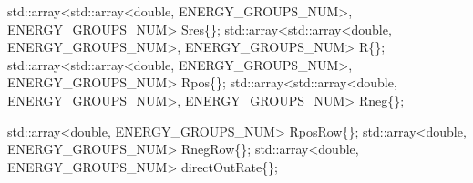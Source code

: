 \documentclass[
]{article}
\newenvironment{Shaded}{}{}
\newcommand{\BuiltInTok}[1]{\textcolor[rgb]{0.00,0.50,0.00}{#1}}
\newcommand{\DataTypeTok}[1]{\textcolor[rgb]{0.56,0.13,0.00}{#1}}
\newcommand{\NormalTok}[1]{#1}
\newcommand{\OperatorTok}[1]{\textcolor[rgb]{0.40,0.40,0.40}{#1}}
\begin{document}
\begin{Shaded}
\begin{Highlighting}[]
    \BuiltInTok{std::}\NormalTok{array}\OperatorTok{\textless{}}\BuiltInTok{std::}\NormalTok{array}\OperatorTok{\textless{}}\DataTypeTok{double}\OperatorTok{,}\NormalTok{ ENERGY\_GROUPS\_NUM}\OperatorTok{\textgreater{},}\NormalTok{ ENERGY\_GROUPS\_NUM}\OperatorTok{\textgreater{}}\NormalTok{ Sres}\OperatorTok{\{\};}
    \BuiltInTok{std::}\NormalTok{array}\OperatorTok{\textless{}}\BuiltInTok{std::}\NormalTok{array}\OperatorTok{\textless{}}\DataTypeTok{double}\OperatorTok{,}\NormalTok{ ENERGY\_GROUPS\_NUM}\OperatorTok{\textgreater{},}\NormalTok{ ENERGY\_GROUPS\_NUM}\OperatorTok{\textgreater{}}\NormalTok{ R}\OperatorTok{\{\};}
    \BuiltInTok{std::}\NormalTok{array}\OperatorTok{\textless{}}\BuiltInTok{std::}\NormalTok{array}\OperatorTok{\textless{}}\DataTypeTok{double}\OperatorTok{,}\NormalTok{ ENERGY\_GROUPS\_NUM}\OperatorTok{\textgreater{},}\NormalTok{ ENERGY\_GROUPS\_NUM}\OperatorTok{\textgreater{}}\NormalTok{ Rpos}\OperatorTok{\{\};}
    \BuiltInTok{std::}\NormalTok{array}\OperatorTok{\textless{}}\BuiltInTok{std::}\NormalTok{array}\OperatorTok{\textless{}}\DataTypeTok{double}\OperatorTok{,}\NormalTok{ ENERGY\_GROUPS\_NUM}\OperatorTok{\textgreater{},}\NormalTok{ ENERGY\_GROUPS\_NUM}\OperatorTok{\textgreater{}}\NormalTok{ Rneg}\OperatorTok{\{\};}

    \BuiltInTok{std::}\NormalTok{array}\OperatorTok{\textless{}}\DataTypeTok{double}\OperatorTok{,}\NormalTok{ ENERGY\_GROUPS\_NUM}\OperatorTok{\textgreater{}}\NormalTok{ RposRow}\OperatorTok{\{\};}
    \BuiltInTok{std::}\NormalTok{array}\OperatorTok{\textless{}}\DataTypeTok{double}\OperatorTok{,}\NormalTok{ ENERGY\_GROUPS\_NUM}\OperatorTok{\textgreater{}}\NormalTok{ RnegRow}\OperatorTok{\{\};}
    \BuiltInTok{std::}\NormalTok{array}\OperatorTok{\textless{}}\DataTypeTok{double}\OperatorTok{,}\NormalTok{ ENERGY\_GROUPS\_NUM}\OperatorTok{\textgreater{}}\NormalTok{ directOutRate}\OperatorTok{\{\};}


\end{Highlighting}
\end{Shaded}
\end{document}
